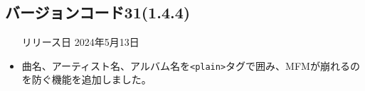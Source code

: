 \subsection*{バージョンコード31(1.4.4)}
\begin{itemize}
    \item[リリース日] 2024年5月13日
\end{itemize}

\new
\begin{itemize}
    \item 曲名、アーティスト名、アルバム名を\verb|<plain>|タグで囲み、MFMが崩れるのを防ぐ機能を追加しました。
\end{itemize}

\change

\fix

